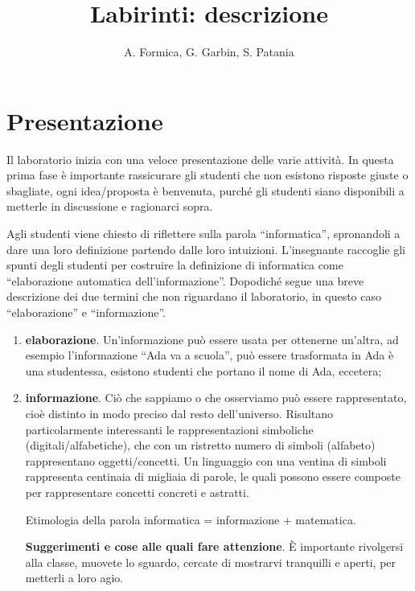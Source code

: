 \documentclass[12pt]{article}
\title{Labirinti: descrizione}
\author{A. Formica, G. Garbin, S. Patania}
\begin{document}
\maketitle
%
% 
\section{Presentazione}
Il laboratorio inizia con una veloce presentazione delle varie attività.
In questa prima fase è importante rassicurare gli studenti che non esistono risposte giuste o sbagliate, ogni idea/proposta è benvenuta, purché gli studenti siano disponibili a metterle in discussione e ragionarci sopra.

Agli studenti viene chiesto di riflettere sulla parola ``informatica'', spronandoli a dare una loro definizione partendo dalle loro intuizioni. L'insegnante raccoglie gli spunti degli studenti per costruire la definizione di informatica come ``elaborazione automatica dell'informazione''. Dopodiché segue una breve descrizione dei due termini che non riguardano il laboratorio, in questo caso ``elaborazione'' e ``informazione''.

\begin{enumerate}
\item \textbf{elaborazione}. Un'informazione può essere usata per ottenerne un'altra, ad esempio  l'informazione ``Ada va a scuola'', può essere trasformata in Ada è una studentessa, esistono studenti che portano il nome di Ada, eccetera;
\item \textbf{informazione}. Ciò che sappiamo o che osserviamo può essere rappresentato, cioè distinto in modo preciso dal resto dell'universo. Risultano particolarmente interessanti le rappresentazioni simboliche (digitali/alfabetiche), che con un ristretto numero di simboli (alfabeto) rappresentano oggetti/concetti. Un linguaggio con una ventina di simboli rappresenta centinaia di migliaia di parole, le quali possono essere composte per rappresentare concetti concreti e astratti.

Etimologia della parola informatica = informazione + matematica.

\textbf{Suggerimenti e cose alle quali fare attenzione}.
È importante rivolgersi alla classe, muovete lo sguardo, cercate di mostrarvi tranquilli e aperti, per metterli a loro agio.

\end{enumerate}
\end{document}
